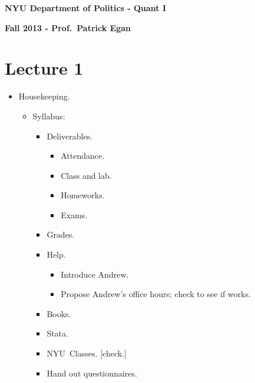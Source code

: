 \documentclass[11pt]{article}
\begin{document}
\singlespacing

\textbf{NYU Department of Politics - Quant I}

\textbf{Fall 2013 - Prof.\ Patrick Egan}

\doublespacing

\section{Lecture 1}

\begin{itemize}
\item Housekeeping.

\begin{itemize}
\item Syllabus:

\begin{itemize}
\item Deliverables.

\begin{itemize}
\item Attendance.

\item Class and lab.

\item Homeworks.

\item Exams.
\end{itemize}

\item Grades.

\item Help.

\begin{itemize}
\item Introduce Andrew.

\item Propose Andrew's office hours; check to see if works.
\end{itemize}

\item Books.

\item Stata.

\item NYU\ Classes. [check.]

\item Hand out questionnaires.
\end{itemize}
\end{itemize}
\end{itemize}
\end{document}
